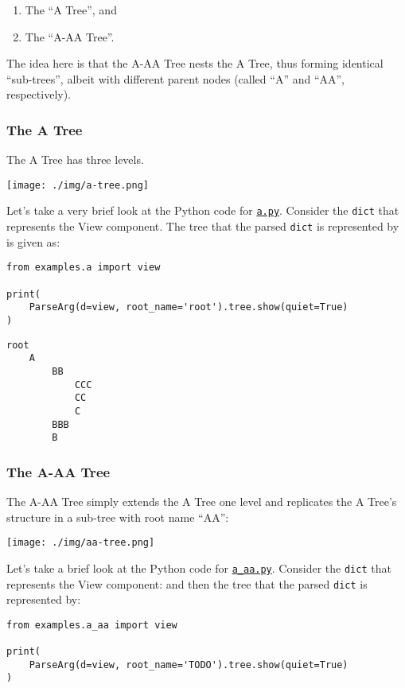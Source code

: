 \documentclass[10pt]{amsart}
\numberwithin{equation}{section}
\begin{document}
\begin{enumerate}
\item The ``A Tree'', and
\item The ``A-AA Tree''.
\end{enumerate}

The idea here is that the A-AA Tree nests the A Tree, thus forming
identical ``sub-trees'', albeit with different parent nodes (called
``A'' and ``AA'', respectively). 

\subsubsection{The A Tree}
\label{sec:org3d399fc}
The A Tree has three levels. 
\begin{center}
\texttt{[image: ./img/a-tree.png]}
\end{center}

Let's take a very brief look at the Python code
for \href{https://raw.githubusercontent.com/tharte/parsearg/master/doc/examples/a.py}{\texttt{a.py}}.
Consider the \texttt{dict} that represents the View component.
The tree that the parsed \texttt{dict} is represented by is given as:
\begin{verbatim}
from examples.a import view

print(
    ParseArg(d=view, root_name='root').tree.show(quiet=True)
)
\end{verbatim}

\begin{verbatim}
root
    A
        BB
            CCC
            CC
            C
        BBB
        B
\end{verbatim}

\subsubsection{The A-AA Tree}
\label{sec:org8d2beb2}
The A-AA Tree simply extends the A Tree one level and replicates the A Tree's 
structure in a sub-tree with root name ``AA'':
\begin{center}
\texttt{[image: ./img/aa-tree.png]}
\end{center}

Let's take a brief look at the Python code
for \href{https://raw.githubusercontent.com/tharte/parsearg/master/doc/examples/a\_aa.py}{\texttt{a\_aa.py}}.
Consider the \texttt{dict} that represents the View component:
and then the tree that the parsed \texttt{dict} is represented by:
\begin{verbatim}
from examples.a_aa import view

print(
    ParseArg(d=view, root_name='TODO').tree.show(quiet=True)
)
\end{verbatim}
\end{document}
